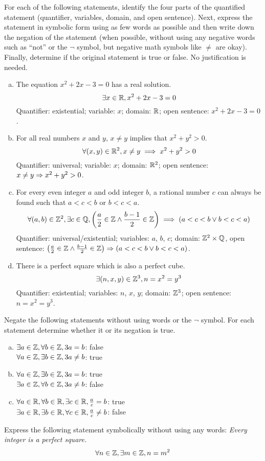 \question For each of the following statements, identify the four parts of the quantified statement
(quantifier, variables, domain, and open sentence).
Next, express the statement in symbolic form using as few words as possible and then write down the negation of the statement
(when possible, without using any negative words such as ``not'' or the $\lnot$ symbol, but negative math symbols like $\neq$ are okay).
Finally, determine if the original statement is true or false.
No justification is needed.
\begin{enumerate}[(a)]
  \item The equation $x^2+2x-3=0$ has a real solution.
        \[ \exists x\in\mathbb{R}, x^2+2x-3 = 0 \]
        Quantifier: existential;
        variable: $x$;
        domain: $\mathbb{R}$;
        open sentence: $x^2+2x-3=0$.
  \item For all real numbers $x$ and $y$, $x \neq y$ implies that $x^2+y^2 > 0$.
        \[ \forall (x,y)\in\mathbb{R}^2, x \neq y \implies x^2+y^2>0 \]
        Quantifier: universal;
        variable: $x$;
        domain: $\mathbb{R}^2$;
        open sentence: $x \neq y \Rightarrow x^2+y^2>0$.
  \item For every even integer $a$ and odd integer $b$, a rational number $c$ can always be found such that $a<c<b$ or $b<c<a$.
        \[ \forall (a,b)\in\mathbb{Z}^2, \exists c\in\mathbb{Q}, \left(\frac{a}{2}\in\mathbb{Z} \land \frac{b-1}{2}\in\mathbb{Z}\right) \implies (a<c<b \lor b<c<a) \]
        Quantifier: universal/existential;
        variables: $a$, $b$, $c$;
        domain: $\mathbb{Z}^2\times\mathbb{Q}$,
        open sentence: $\left(\frac{a}{2}\in\mathbb{Z} \land \frac{b-1}{2}\in\mathbb{Z}\right) \Rightarrow (a<c<b \lor b<c<a)$.
  \item There is a perfect square which is also a perfect cube.
        \[ \exists (n,x,y)\in\mathbb{Z}^3, n=x^2=y^3 \]
        Quantifier: existential; variables: $n$, $x$, $y$; domain: $\mathbb{Z}^3$; open sentence: $n=x^2=y^3$.
\end{enumerate}


\question Negate the following statements without using words or the $\lnot$ symbol.
For each statement determine whether it or its negation is true.
\begin{enumerate}[(a)]
  \item $\exists a \in \mathbb{Z}, \forall b \in \mathbb{Z}, 3a=b$: false \\
        $\forall a \in \mathbb{Z}, \exists b \in \mathbb{Z}, 3a \neq b$: true
  \item $\forall a \in \mathbb{Z}, \exists b \in \mathbb{Z}, 3a=b$: true \\
        $\exists a \in \mathbb{Z}, \forall b \in \mathbb{Z}, 3a \neq b$: false
  \item $\forall a \in \mathbb{R}, \forall b \in \mathbb{R}, \exists c \in \mathbb{R}, \frac{a}{c}=b$: true \\
        $\exists a \in \mathbb{R}, \exists b \in \mathbb{R}, \forall c \in \mathbb{R}, \frac{a}{c} \neq b$: false
\end{enumerate}


\question Express the following statement symbolically without using any words:
\emph{Every integer is a perfect square.}
\[ \forall n\in\mathbb{Z}, \exists m\in\mathbb{Z}, n = m^2 \]

